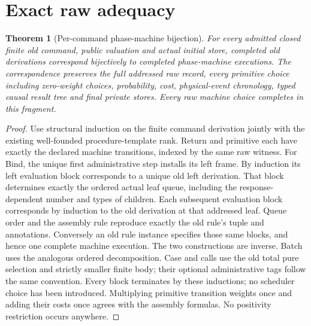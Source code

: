 \documentclass[11pt]{article}
\newtheorem{theorem}{Theorem}\newtheorem{definition}{Definition}\newtheorem{proposition}{Proposition}
\begin{document}
\section{Exact raw adequacy}
\begin{theorem}[Per-command phase-machine bijection]\label{bridge-adequacy}
For every admitted closed finite old command, public valuation and actual initial store, completed old derivations correspond bijectively to completed phase-machine executions. The correspondence preserves the full addressed raw record, every primitive choice including zero-weight choices, probability, cost, physical-event chronology, typed causal result tree and final private stores. Every raw machine choice completes in this fragment.
\end{theorem}
\begin{proof}
Use structural induction on the finite command derivation jointly with the existing well-founded procedure-template rank. Return and primitive each have exactly the declared machine transitions, indexed by the same raw witness. For Bind, the unique first administrative step installs its left frame. By induction its left evaluation block corresponds to a unique old left derivation. That block determines exactly the ordered actual leaf queue, including the response-dependent number and types of children. Each subsequent evaluation block corresponds by induction to the old derivation at that addressed leaf. Queue order and the assembly rule reproduce exactly the old rule's tuple and annotations. Conversely an old rule instance specifies those same blocks, and hence one complete machine execution. The two constructions are inverse. Batch uses the analogous ordered decomposition. Case and calls use the old total pure selection and strictly smaller finite body; their optional administrative tags follow the same convention. Every block terminates by these inductions; no scheduler choice has been introduced. Multiplying primitive transition weights once and adding their costs once agrees with the assembly formulas. No positivity restriction occurs anywhere.
\end{proof}
\end{document}
